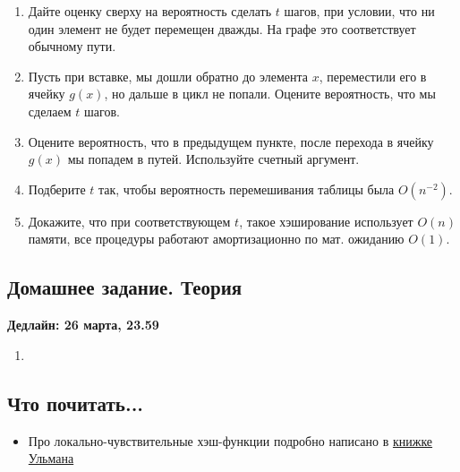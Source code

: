 \begin{itemize}
\begin{enumerate}
      \item Дайте оценку сверху на вероятность сделать $t$ шагов, при условии, что ни 
        один элемент не будет перемещен дважды. На графе это соответствует обычному пути.

      \item Пусть при вставке, мы дошли обратно до элемента $x$, переместили его в ячейку
        $g(x)$, но дальше в цикл не попали. Оцените вероятность, что мы сделаем $t$ шагов.
  
      \item Оцените вероятность, что в предыдущем пункте, после перехода в ячейку $g(x)$
        мы попадем в путей. Используйте счетный аргумент.

      \item Подберите $t$ так, чтобы вероятность перемешивания таблицы была $O(n^{-2})$.
      
      \item Докажите, что при соответствующем $t$, такое хэширование использует $O(n)$ памяти,
        все процедуры работают амортизационно по мат. ожиданию $O(1)$.
        
    \end{enumerate}
   


\end{itemize}


\subsection{Домашнее задание. Теория}
\textbf{Дедлайн: 26 марта, 23.59}

\begin{enumerate}

  \item 
\end{enumerate}

\subsection{Что почитать...}

\begin{itemize}

\item Про локально-чувствительные хэш-функции подробно написано в \href{http://infolab.stanford.edu/~ullman/mmds/book.pdf}{книжке Ульмана}
  
\end{itemize}


\clearpage
